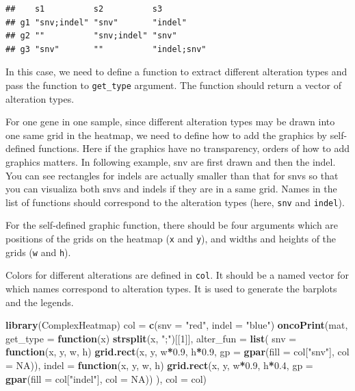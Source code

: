 \documentclass[]{book}
\newenvironment{Shaded}{\begin{snugshade}}{\end{snugshade}}
\newcommand{\KeywordTok}[1]{\textcolor[rgb]{0.13,0.29,0.53}{\textbf{#1}}}
\newcommand{\DataTypeTok}[1]{\textcolor[rgb]{0.13,0.29,0.53}{#1}}
\newcommand{\DecValTok}[1]{\textcolor[rgb]{0.00,0.00,0.81}{#1}}
\newcommand{\FloatTok}[1]{\textcolor[rgb]{0.00,0.00,0.81}{#1}}
\newcommand{\StringTok}[1]{\textcolor[rgb]{0.31,0.60,0.02}{#1}}
\newcommand{\OtherTok}[1]{\textcolor[rgb]{0.56,0.35,0.01}{#1}}
\newcommand{\ControlFlowTok}[1]{\textcolor[rgb]{0.13,0.29,0.53}{\textbf{#1}}}
\newcommand{\OperatorTok}[1]{\textcolor[rgb]{0.81,0.36,0.00}{\textbf{#1}}}
\newcommand{\NormalTok}[1]{#1}
\theoremstyle{definition}
\theoremstyle{definition}
\theoremstyle{definition}
\theoremstyle{remark}
\begin{document}
\begin{verbatim}
##    s1          s2          s3         
## g1 "snv;indel" "snv"       "indel"    
## g2 ""          "snv;indel" "snv"      
## g3 "snv"       ""          "indel;snv"
\end{verbatim}

In this case, we need to define a function to extract different
alteration types and pass the function to \texttt{get\_type} argument.
The function should return a vector of alteration types.

For one gene in one sample, since different alteration types may be
drawn into one same grid in the heatmap, we need to define how to add
the graphics by self-defined functions. Here if the graphics have no
transparency, orders of how to add graphics matters. In following
example, snv are first drawn and then the indel. You can see rectangles
for indels are actually smaller than that for snvs so that you can
visualiza both snvs and indels if they are in a same grid. Names in the
list of functions should correspond to the alteration types (here,
\texttt{snv} and \texttt{indel}).

For the self-defined graphic function, there should be four arguments
which are positions of the grids on the heatmap (\texttt{x} and
\texttt{y}), and widths and heights of the grids (\texttt{w} and
\texttt{h}).

Colors for different alterations are defined in \texttt{col}. It should
be a named vector for which names correspond to alteration types. It is
used to generate the barplots and the legends.

\begin{Shaded}
\begin{Highlighting}[]
\KeywordTok{library}\NormalTok{(ComplexHeatmap)}
\NormalTok{col =}\StringTok{ }\KeywordTok{c}\NormalTok{(}\DataTypeTok{snv =} \StringTok{"red"}\NormalTok{, }\DataTypeTok{indel =} \StringTok{"blue"}\NormalTok{)}
\KeywordTok{oncoPrint}\NormalTok{(mat, }\DataTypeTok{get_type =} \ControlFlowTok{function}\NormalTok{(x) }\KeywordTok{strsplit}\NormalTok{(x, }\StringTok{";"}\NormalTok{)[[}\DecValTok{1}\NormalTok{]],}
    \DataTypeTok{alter_fun =} \KeywordTok{list}\NormalTok{(}
        \DataTypeTok{snv =} \ControlFlowTok{function}\NormalTok{(x, y, w, h) }\KeywordTok{grid.rect}\NormalTok{(x, y, w}\OperatorTok{*}\FloatTok{0.9}\NormalTok{, h}\OperatorTok{*}\FloatTok{0.9}\NormalTok{, }\DataTypeTok{gp =} \KeywordTok{gpar}\NormalTok{(}\DataTypeTok{fill =}\NormalTok{ col[}\StringTok{"snv"}\NormalTok{], }\DataTypeTok{col =} \OtherTok{NA}\NormalTok{)),}
        \DataTypeTok{indel =} \ControlFlowTok{function}\NormalTok{(x, y, w, h) }\KeywordTok{grid.rect}\NormalTok{(x, y, w}\OperatorTok{*}\FloatTok{0.9}\NormalTok{, h}\OperatorTok{*}\FloatTok{0.4}\NormalTok{, }\DataTypeTok{gp =} \KeywordTok{gpar}\NormalTok{(}\DataTypeTok{fill =}\NormalTok{ col[}\StringTok{"indel"}\NormalTok{], }\DataTypeTok{col =} \OtherTok{NA}\NormalTok{))}
\NormalTok{    ), }\DataTypeTok{col =}\NormalTok{ col)}
\end{Highlighting}
\end{Shaded}
\end{document}
